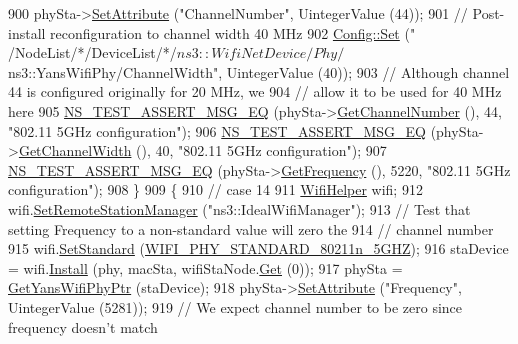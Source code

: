 \begin{DoxyCode}
900     phySta->\hyperlink{classns3_1_1ObjectBase_ac60245d3ea4123bbc9b1d391f1f6592f}{SetAttribute} (\textcolor{stringliteral}{"ChannelNumber"}, UintegerValue (44));
901     \textcolor{comment}{// Post-install reconfiguration to channel width 40 MHz}
902     \hyperlink{group__config_gadce03667ec621d64ce4aace85d9bcfd0}{Config::Set} (\textcolor{stringliteral}{"
      /NodeList/*/DeviceList/*/$ns3::WifiNetDevice/Phy/$ns3::YansWifiPhy/ChannelWidth"}, UintegerValue (40));
903     \textcolor{comment}{// Although channel 44 is configured originally for 20 MHz, we}
904     \textcolor{comment}{// allow it to be used for 40 MHz here}
905     \hyperlink{group__testing_ga2a9d78cffb3db8e867c35fff0b698cf5}{NS\_TEST\_ASSERT\_MSG\_EQ} (phySta->\hyperlink{classns3_1_1WifiPhy_a5cf0ccf06109ace61db51c83e91b7e8d}{GetChannelNumber} (), 44, \textcolor{stringliteral}{"802.11
       5GHz configuration"});
906     \hyperlink{group__testing_ga2a9d78cffb3db8e867c35fff0b698cf5}{NS\_TEST\_ASSERT\_MSG\_EQ} (phySta->\hyperlink{classns3_1_1WifiPhy_a4a5d5009b3b3308f2baeed42a2007189}{GetChannelWidth} (), 40, \textcolor{stringliteral}{"802.11 5GHz
       configuration"});
907     \hyperlink{group__testing_ga2a9d78cffb3db8e867c35fff0b698cf5}{NS\_TEST\_ASSERT\_MSG\_EQ} (phySta->\hyperlink{classns3_1_1WifiPhy_ad2508d94faf22d690d6b8b4367934fd1}{GetFrequency} (), 5220, \textcolor{stringliteral}{"802.11 5GHz
       configuration"});
908   \}
909   \{
910     \textcolor{comment}{// case 14}
911     \hyperlink{classns3_1_1WifiHelper}{WifiHelper} wifi;
912     wifi.\hyperlink{classns3_1_1WifiHelper_a3d01b178aeb2de246ab5a3aa5638ce24}{SetRemoteStationManager} (\textcolor{stringliteral}{"ns3::IdealWifiManager"});
913     \textcolor{comment}{// Test that setting Frequency to a non-standard value will zero the}
914     \textcolor{comment}{// channel number}
915     wifi.\hyperlink{classns3_1_1WifiHelper_aa54f3e61527ef8de318d310045bc5dfd}{SetStandard} (\hyperlink{group__wifi_gga1299834f4e1c615af3ca738033b76a49aaabe94a0be4668583c42595437b4a6c0}{WIFI\_PHY\_STANDARD\_80211n\_5GHZ});
916     staDevice = wifi.\hyperlink{classns3_1_1WifiHelper_a451b3d33fa1497c22f06c5451f57a127}{Install} (phy, macSta, wifiStaNode.\hyperlink{classns3_1_1NodeContainer_a9ed96e2ecc22e0f5a3d4842eb9bf90bf}{Get} (0));
917     phySta = \hyperlink{classSetChannelFrequencyTest_aa30a0a39f98c2d825152681ba8b9f4e1}{GetYansWifiPhyPtr} (staDevice);
918     phySta->\hyperlink{classns3_1_1ObjectBase_ac60245d3ea4123bbc9b1d391f1f6592f}{SetAttribute} (\textcolor{stringliteral}{"Frequency"}, UintegerValue (5281));
919     \textcolor{comment}{// We expect channel number to be zero since frequency doesn't match}

\end{DoxyCode}
